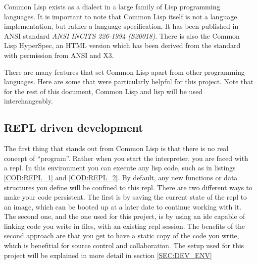 
\label{SEC:CL}

Common Lisp exists as a dialect in a large family of Lisp programming languages.
It is important to note that Common Lisp itself is not a language implementation,
but rather a language specification.
It has been published in ANSI standard \textit{ANSI INCITS 226-1994 (S20018)}.
There is also the Common Lisp HyperSpec,
an HTML version which has been derived from the standard with permission from ANSI and X3.\cite{clhs}

There are many features that set Common Lisp apart from other programming languages.
Here are some that were particularly helpful for this project.
Note that for the rest of this document,
Common Lisp and lisp will be used interchangeably.

\subsection{REPL driven development}

The first thing that stands out from Common Lisp is that there is no real concept of ``program''.
Rather when you start the interpreter,
you are faced with a \ac{repl}.
In this environment you can execute any lisp code,
such as in listings \ref{COD:REPL_1} and \ref{COD:REPL_2}.
By default,
any new functions or data structures you define will be confined to this \ac{repl}.
There are two different ways to make your code persistent.
The first is by saving the current state of the \ac{repl} to an image,
which can be booted up at a later date to continue working with it.
The second one,
and the one used for this project,
is by using an \ac{ide} capable of linking code you write in files,
with an existing \ac{repl} session.
The benefits of the second approach are that you get to have a static copy of the code you write,
which is benefitial for source control and collaboration.
The setup used for this project will be explained in more detail in section \ref{SEC:DEV_ENV}



